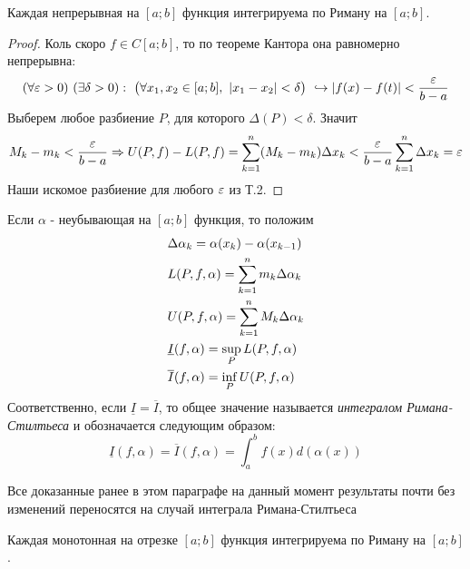 \begin{theorem}
	Каждая непрерывная на $[a; b]$ функция интегрируема по Риману на $[a; b]$.
\end{theorem}

\begin{proof}
	Коль скоро $f \in C[a; b]$, то по теореме Кантора она равномерно непрерывна:
	\[
		(\forall \eps > 0)\ (\exists \delta > 0):\ \bigl( \forall x_1, x_2 \in [a; b],\ |x_1 - x_2| < \delta\bigr)\ \hookrightarrow |f(x) - f(t)| < \frac{\eps}{b - a}
	\]
	Выберем любое разбиение $P$, для которого $\Delta(P) < \delta$. Значит
	\[
		M_k - m_k < \frac{\varepsilon}{b - a} \Rightarrow U(P, f) - L(P, f) = \sum\limits_{k = 1}^n (M_k - m_k) \Delta x_k < \frac{\varepsilon}{b - a} \sum\limits_{k = 1}^n \Delta x_k = \varepsilon
	\]
	Наши искомое разбиение для любого $\varepsilon$ из Т.2.
\end{proof}

\begin{definition}
	Если $\alpha$ - неубывающая на $[a; b]$ функция, то положим
	\begin{align*}
		&{\Delta \alpha_k = \alpha(x_k) - \alpha(x_{k - 1})}
		\\
		&{L(P, f, \alpha) = \sum\limits_{k = 1}^n m_k \Delta \alpha_k}
		\\
		&{U(P, f, \alpha) = \sum\limits_{k = 1}^n M_k \Delta \alpha_k}
		\\
		&{\underline{I}(f, \alpha) = \sup\limits_P L(P, f, \alpha)}
		\\
		&{\overline{I}(f, \alpha) = \inf\limits_P U(P, f, \alpha)}
	\end{align*}
	Соответственно, если $\underline{I} = \overline{I}$, то общее значение называется \textit{интегралом Римана-Стилтьеса} и обозначается следующим образом:
	\[
		\underline{I}(f, \alpha) = \overline{I}(f, \alpha) = \int_a^b f(x) d(\alpha(x))
	\]
\end{definition}

\begin{note}
	Все доказанные ранее в этом параграфе на данный момент результаты почти без изменений переносятся на случай интеграла Римана-Стилтьеса
\end{note}

\begin{theorem}
	Каждая монотонная на отрезке $[a; b]$ функция интегрируема по Риману на $[a; b]$.
\end{theorem}

